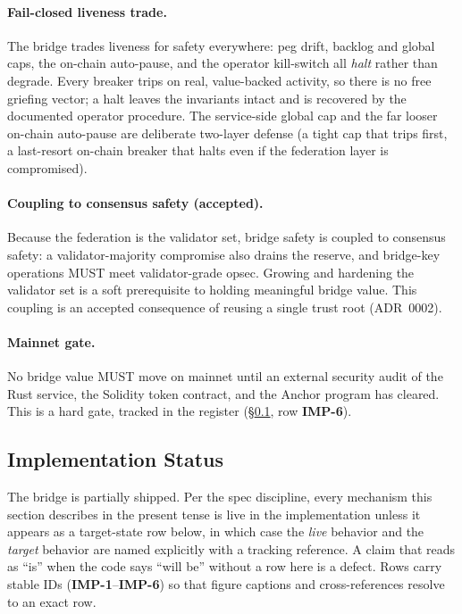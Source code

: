 \paragraph{Fail-closed liveness trade.} The bridge trades liveness for safety
everywhere: peg drift, backlog and global caps, the on-chain auto-pause, and the
operator kill-switch all \emph{halt} rather than degrade. Every breaker trips on
real, value-backed activity, so there is no free griefing vector; a halt leaves
the invariants intact and is recovered by the documented operator procedure. The
service-side global cap and the far looser on-chain auto-pause are deliberate
two-layer defense (a tight cap that trips first, a last-resort on-chain breaker
that halts even if the federation layer is compromised).

\paragraph{Coupling to consensus safety (accepted).} Because the federation is
the validator set, bridge safety is coupled to consensus safety: a
validator-majority compromise also drains the reserve, and bridge-key operations
MUST meet validator-grade opsec. Growing and hardening the validator set is a
soft prerequisite to holding meaningful bridge value. This coupling is an
accepted consequence of reusing a single trust root (ADR~0002).

\paragraph{Mainnet gate.} No bridge value MUST move on mainnet until an external
security audit of the Rust service, the Solidity token contract, and the Anchor
program has cleared. This is a hard gate, tracked in the register
(\S\ref{sec:bridge:status}, row \textbf{IMP-6}).

\subsection{Implementation Status}
\label{sec:bridge:status}

The bridge is partially shipped. Per the spec discipline, every mechanism this
section describes in the present tense is live in the implementation unless it
appears as a target-state row below, in which case the \emph{live} behavior and
the \emph{target} behavior are named explicitly with a tracking reference. A
claim that reads as ``is'' when the code says ``will be'' without a row here is
a defect. Rows carry stable IDs (\textbf{IMP-1}--\textbf{IMP-6}) so that figure
captions and cross-references resolve to an exact row.

